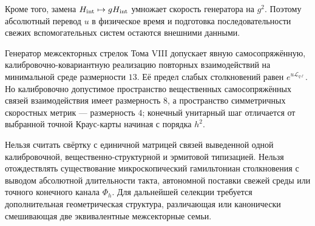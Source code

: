 Кроме того, замена $H_{\rm int}\mapsto gH_{\rm int}$ умножает скорость
генератора на $g^2$. Поэтому абсолютный перевод $u$ в физическое время и
подготовка последовательности свежих вспомогательных систем остаются внешними данными.

\begin{theorem}
Генератор межсекторных стрелок Тома VIII допускает явную самосопряжённую,
калибровочно-ковариантную реализацию повторных взаимодействий на минимальной среде
размерности $13$. Её предел слабых столкновений равен
$e^{u\mathcal L_{q\ell}}$. Но калибровочно допустимое пространство вещественных
самосопряжённых связей взаимодействия имеет размерность $8$, а пространство
симметричных скоростных метрик --- размерность $4$;
конечный унитарный шаг отличается от выбранной точной Краус-карты начиная с
порядка $h^2$.
\end{theorem}

\begin{nogocriterion}
Нельзя считать свёртку с единичной матрицей связей выведенной одной
калибровочной, вещественно-структурной и эрмитовой типизацией. Нельзя отождествлять существование
микроскопический гамильтониан столкновения с выводом абсолютной длительности такта,
автономной поставки свежей среды или точного конечного канала $\Phi_h$.
Для дальнейшей селекции требуется дополнительная геометрическая структура,
различающая или канонически смешивающая две эквивалентные межсекторные семьи.
\end{nogocriterion}

